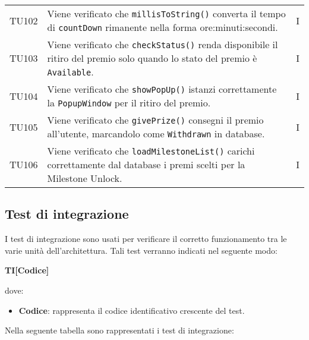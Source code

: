 \begin{longtable}{ >{\centering}p{}  >{\centering}p{} >{\centering}p{}
			}
				\tabularnewline
		
		TU102 & Viene verificato che \texttt{millisToString()} converta il tempo di \texttt{countDown} rimanente nella forma ore:minuti:secondi. & I 
		\tabularnewline	
		TU103 & Viene verificato che \texttt{checkStatus()} renda disponibile il ritiro del premio solo quando lo stato del premio è \texttt{Available}. & I
		\tabularnewline	
		TU104 & Viene verificato che \texttt{showPopUp()} istanzi correttamente la \texttt{PopupWindow} per il ritiro del premio. & I 
		\tabularnewline	
		TU105 & Viene verificato che \texttt{givePrize()} consegni il premio all'utente, marcandolo come \texttt{Withdrawn} in database. & I 
		\tabularnewline	
		TU106 & Viene verificato che \texttt{loadMilestoneList()} carichi correttamente dal database i premi scelti per la Milestone Unlock. & I 
		
		
		\end{longtable}
		
		
		\newpage
\subsection{Test di integrazione}
I test di integrazione sono usati per verificare il corretto funzionamento tra le varie unità dell'architettura. Tali test verranno indicati nel seguente modo:\\
	\centerline{\textbf{TI[Codice]}}
dove:
\begin{itemize}
	\item \textbf{Codice}: rappresenta il codice identificativo crescente del test.
\end{itemize}
Nella seguente tabella sono rappresentati i test di integrazione:
\renewcommand{\arraystretch}{1.5}

